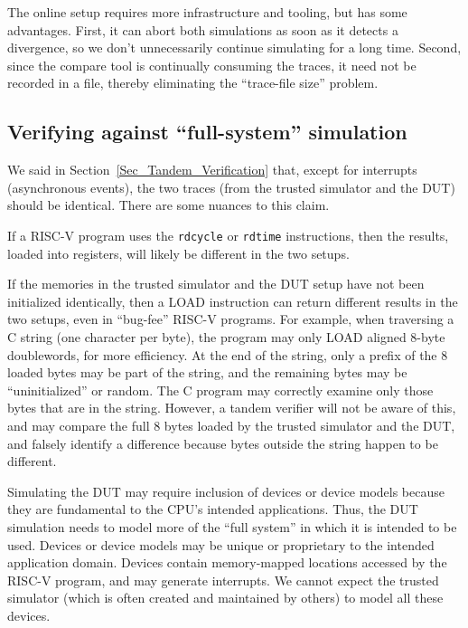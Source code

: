 The online setup requires more infrastructure and tooling, but has
some advantages.  First, it can abort both simulations as soon as it
detects a divergence, so we don't unnecessarily continue simulating
for a long time.  Second, since the compare tool is continually
consuming the traces, it need not be recorded in a file, thereby
eliminating the ``trace-file size'' problem.


\subsection{Verifying against ``full-system'' simulation}

\label{Sec_Tandem_Verification_Mode}

We said in Section~\ref{Sec_Tandem_Verification} that, except for
interrupts (asynchronous events), the two traces (from the trusted
simulator and the DUT) should be identical.  There are some nuances to
this claim.

If a RISC-V program uses the \verb|rdcycle| or \verb|rdtime|
instructions, then the results, loaded into registers, will likely be
different in the two setups.

If the memories in the trusted simulator and the DUT setup have not
been initialized identically, then a LOAD instruction can return
different results in the two setups, even in ``bug-fee'' RISC-V
programs.  For example, when traversing a C string (one character per
byte), the program may only LOAD aligned 8-byte doublewords, for more
efficiency. At the end of the string, only a prefix of the 8 loaded
bytes may be part of the string, and the remaining bytes may be
``uninitialized'' or random.  The C program may correctly examine only
those bytes that are in the string.  However, a tandem verifier will
not be aware of this, and may compare the full 8 bytes loaded by the
trusted simulator and the DUT, and falsely identify a difference
because bytes outside the string happen to be different.

Simulating the DUT may require inclusion of devices or device models
because they are fundamental to the CPU's intended applications.
Thus, the DUT simulation needs to model more of the ``full system'' in
which it is intended to be used.  Devices or device models may be
unique or proprietary to the intended application domain.  Devices
contain memory-mapped locations accessed by the RISC-V program, and
may generate interrupts.  We cannot expect the trusted simulator
(which is often created and maintained by others) to model all these
devices.

